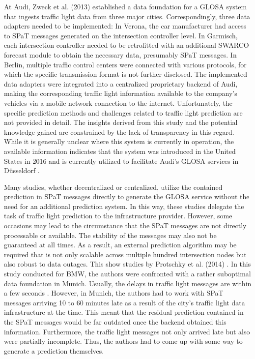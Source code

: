 At Audi, Zweck et al. (2013) \cite{zweck_traffic_2013} established a data foundation for a GLOSA system that ingests traffic light data from three major cities. Correspondingly, three data adapters needed to be implemented: In Verona, the car manufacturer had access to SPaT messages generated on the intersection controller level. In Garmisch, each intersection controller needed to be retrofitted with an additional SWARCO forecast module to obtain the necessary data, presumably SPaT messages. In Berlin, multiple traffic control centers were connected with various protocols, for which the specific transmission format is not further disclosed. The implemented data adapters were integrated into a centralized proprietary backend of Audi, making the corresponding traffic light information available to the company's vehicles via a mobile network connection to the internet. Unfortunately, the specific prediction methods and challenges related to traffic light prediction are not provided in detail. The insights derived from this study and the potential knowledge gained are constrained by the lack of transparency in this regard. While it is generally unclear where this system is currently in operation, the available information indicates that the system was introduced in the United States in 2016 and is currently utilized to facilitate Audi's GLOSA services in Düsseldorf \cite{neuner_leitfaden_2020}.

Many studies, whether decentralized or centralized, utilize the contained prediction in SPaT messages directly to generate the GLOSA service without the need for an additional prediction system. In this way, these studies delegate the task of traffic light prediction to the infrastructure provider. However, some occasions may lead to the circumstance that the SPaT messages are not directly processable or available. The stability of the messages may also not be guaranteed at all times. As a result, an external prediction algorithm may be required that is not only scalable across multiple hundred intersection nodes but also robust to data outages. This show studies by Protschky et al. (2014) \cite{protschky_extensive_2014, protschky_adaptive_2014}. In this study conducted for BMW, the authors were confronted with a rather suboptimal data foundation in Munich. Usually, the delays in traffic light messages are within a few seconds \cite{neuner_leitfaden_2020}. However, in Munich, the authors had to work with SPaT messages arriving 10 to 60 minutes late as a result of the city's traffic light data infrastructure at the time. This meant that the residual prediction contained in the SPaT messages would be far outdated once the backend obtained this information. Furthermore, the traffic light messages not only arrived late but also were partially incomplete. Thus, the authors had to come up with some way to generate a prediction themselves. 

